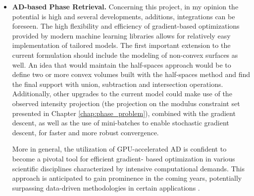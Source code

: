 \begin{itemize}
    \item \textbf{AD-based Phase Retrieval.} Concerning this project, in my opinion the potential is high and several 
    developments, additions, integrations can be foreseen. The high flexibility and efficiency of gradient-based 
    optimizations provided by modern machine learning libraries allows for relatively easy implementation of tailored 
    models. The first important extension to the current formulation should include the modeling of non-convex surfaces 
    as well. An idea that would maintain the half-spaces approach would be to define two or more convex volumes built 
    with the half-spaces method and find the final support with union, subtraction and intersection operations. 
    Additionally, other upgrades to the current model could make use of the observed intensity projection 
    (the projection on the modulus constraint set presented in Chapter \ref{chap:phase_problem}), combined with the 
    gradient descent, as well as the use of mini-batches to enable stochastic gradient descent, 
    for faster and more robust convergence. 
    
    More in general, the utilization of GPU-accelerated AD is confident to become a pivotal tool for efficient gradient-
    based optimization in various scientific disciplines characterized by intensive computational demands. This approach 
    is anticipated to gain prominence in the coming years, potentially surpassing data-driven methodologies in certain 
    applications \cite{baydin2018,STIERLE2024120380, 10487099}.

\end{itemize}

